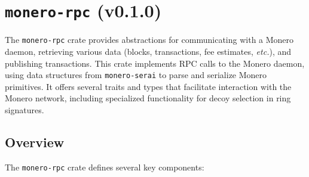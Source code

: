 \documentclass[12pt,a4paper]{article}
\begin{document}



\section{\texttt{monero-rpc} (v0.1.0)}
\label{sec:monero-rpc-crate}
The \texttt{monero-rpc} crate provides abstractions for communicating with a Monero daemon,
retrieving various data (blocks, transactions, fee estimates, \emph{etc.}), and publishing
transactions. This crate implements RPC calls to the Monero daemon, using data structures from
\texttt{monero-serai} to parse and serialize Monero primitives. It offers several traits and types
that facilitate interaction with the Monero network, including specialized functionality for decoy
selection in ring signatures.

\subsection{Overview}
\label{sec:monero-rpc-overview}

The \texttt{monero-rpc} crate defines several key components:
\end{document}
